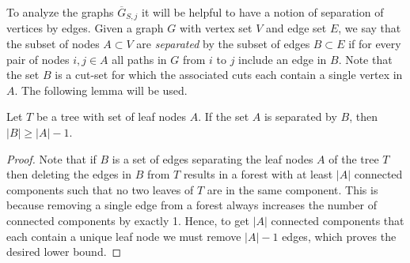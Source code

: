 To analyze the graphs $\overline{G}_{S,j}$ it will be helpful to have a notion of separation of vertices by edges. 
Given a graph $G$ with vertex set $V$ and edge set $E$, we say that the subset of nodes $A\subset V$ are \emph{separated} by the subset of edges $B\subset E$ if for every pair of nodes $i,j\in A$ all paths in $G$ from $i$ to $j$ include an edge in $B$. 
Note that the set $B$ is a cut-set for which the associated cuts each contain a single vertex in $A$. 
The following lemma will be used.
\begin{lemm}
\label{lem: separating tree leaves}
Let $T$ be a tree with set of leaf nodes $A$.  
If the set $A$ is separated by $B$, then $|B| \geq |A|-1$. 
\end{lemm}

\begin{proof}
    Note that if $B$ is a set of edges separating the leaf nodes $A$ of the tree $T$ then deleting the edges in $B$ from $T$ results in a forest with at least $|A|$ connected components such that no two leaves of $T$ are in the same component.  This is because removing a single edge from a forest always increases the number of connected components by exactly 1. Hence, to get $|A|$ connected components that each contain a unique leaf node we must remove $|A| - 1$ edges, which proves the desired lower bound.
\end{proof}

